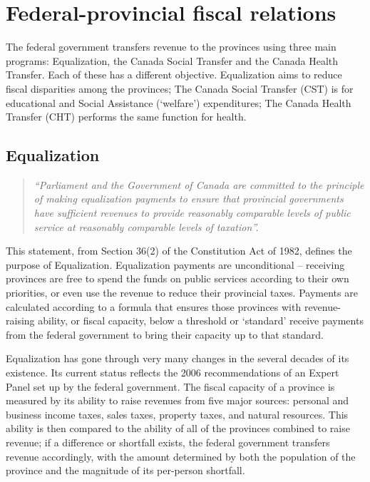 \section{Federal-provincial fiscal relations}\label{sec:ch14sec3}

The federal government transfers revenue to the provinces using three main programs: Equalization, the Canada Social Transfer and the Canada Health Transfer. Each of these has a different objective. Equalization aims to reduce fiscal disparities among the provinces; The Canada Social Transfer (CST) is for educational and Social Assistance (`welfare') expenditures; The Canada Health Transfer (CHT) performs the same function for health. 

\subsection*{Equalization}

\begin{quote}
\textit{``Parliament and the Government of Canada are committed to the principle of making equalization payments to ensure that provincial governments have sufficient revenues to provide reasonably comparable levels of public service at reasonably comparable levels of taxation''.}
\end{quote}

This statement, from Section 36(2) of the Constitution Act of 1982, defines the purpose of Equalization. Equalization payments are unconditional -- receiving provinces are free to spend the funds on public services according to their own priorities, or even use the revenue to reduce their provincial taxes. Payments are calculated according to a formula that ensures those provinces with revenue-raising ability, or fiscal capacity, below a threshold or `standard' receive payments from the federal government to bring their capacity up to that standard. 

Equalization has gone through very many changes in the several decades of its existence. Its current status reflects the 2006 recommendations of an Expert Panel set up by the federal government. The fiscal capacity of a province is measured by its ability to raise revenues from five major sources:  personal and business income taxes, sales taxes, property taxes, and natural resources. This ability is then compared to the ability of all of the provinces combined to raise revenue; if a difference or shortfall exists, the federal government transfers revenue accordingly, with the amount determined by both the population of the province and the magnitude of its per-person shortfall.  

